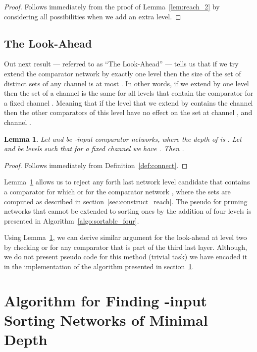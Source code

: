 \documentclass[13pt,a4paper]{article}
\newtheorem{lemma}[theorem]{Lemma}
\begin{document}
\begin{proof}
Follows immediately from the proof of Lemma~\ref{lem:reach_2} by considering all possibilities when we add an extra level.
\end{proof}



\subsection{The Look-Ahead}

Out next result --- referred to as ``The Look-Ahead'' --- tells us that if we try extend the comparator network  by exactly one level then the size of the set of distinct  sets of any channel  is at most . In other words, if we extend  by one level then the  set of a channel  is the same for all levels that contain the comparator  for a fixed channel . Meaning that if the level  that we extend  by contains the channel  then the other comparators of this level have no effect on the  set at channel , and channel .

\begin{lemma}
\label{lem:look_ahead}
Let  and  be -input comparator networks, where the depth of  is . Let  and  be levels such that for a fixed channel  we have     . Then .
\end{lemma}

\begin{proof}
Follows immediately from Definition~\ref{def:connect}. 
\end{proof}

Lemma~\ref{lem:look_ahead} allows us to reject any forth last network level candidate that contains a comparator  for which  or  for the comparator network , where the  sets are computed as described in section~\ref{sec:construct_reach}. The pseudo for pruning networks that cannot be extended to sorting ones by the addition of four levels is presented in Algorithm~\ref{algo:sortable_four}.

Using Lemma~\ref{lem:look_ahead}, we can derive similar argument for the look-ahead at level two by checking  or  for any comparator  that is part of the third last layer. Although, we do not present pseudo code for this method (trivial task) we have encoded it in the implementation of the algorithm presented in section~\ref{sec:algorithm}.






\section{Algorithm for Finding -input Sorting Networks of Minimal Depth}
\label{sec:algorithm}
\end{document}
